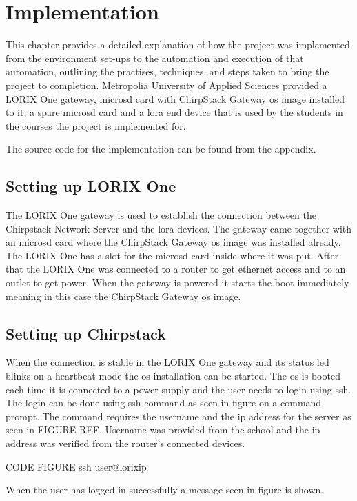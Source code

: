 
\chapter{Implementation} \label{ch:impl}
This chapter provides a detailed explanation of how the project was implemented from the environment set-ups to the automation and execution of that automation, outlining the practises, techniques, and steps taken to bring the project to completion.
Metropolia University of Applied Sciences provided a LORIX One gateway, micro\gls{sd} card with ChirpStack Gateway \gls{os} image installed to it, a spare micro\gls{sd} card and a \gls{lora} end device that is used by the students in the courses the project is implemented for.

The source code for the implementation can be found from the appendix.

\section{Setting up LORIX One}
The LORIX One gateway is used to establish the connection between the Chirpstack Network Server and the \gls{lora} devices.
The gateway came together with an micro\gls{sd} card where the ChirpStack Gateway \gls{os} image was installed already.
The LORIX One has a slot for the micro\gls{sd} card inside where it was put.
After that the LORIX One was connected to a router to get ethernet access and to an outlet to get power.
When the gateway is powered it starts the boot immediately meaning in this case the ChirpStack Gateway \gls{os} image.

\section{Setting up Chirpstack}
When the connection is stable in the LORIX One gateway and its status led blinks on a heartbeat mode the \gls{os} installation can be started.
The \gls{os} is booted each time it is connected to a power supply and the user needs to login using \gls{ssh}.
The login can be done using ssh command as seen in figure on a command prompt.
The command requires the username and the \gls{ip} address for the server as seen in FIGURE REF.
Username was provided from the school and the \gls{ip} address was verified from the router's connected devices.

CODE FIGURE ssh user@lorixip

When the user has logged in successfully a message seen in figure is shown.

